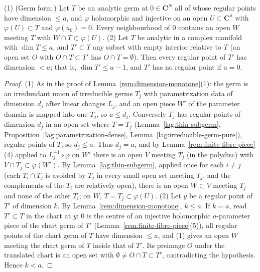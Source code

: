 \begin{lemma}
\label{rem:thin-dimension-drop}
\leanok
(1) (Germ form.) Let \(T\) be an analytic germ at \(0\in\mathbf C^N\) all of whose regular points have dimension \(\le a\), and \(\varphi\) holomorphic and injective on an
open \(U\subset\mathbf C^a\) with \(\varphi(U)\subset T\) and \(\varphi(u_0)=0\). Every neighbourhood of \(0\) contains an open \(W\) meeting \(T\) with \(W\cap T\subset\varphi(U)\).
(2) Let \(T\) be analytic in a complex manifold with \(\dim T\le a\), and \(T'\subset T\) any subset with empty interior relative to \(T\) (an open set \(O\) with
\(O\cap T\subset T'\) has \(O\cap T=\emptyset\)). Then every regular point of \(T'\) has dimension \(<a\); that is, \(\dim T'\le a-1\), and \(T'\) has no regular point if \(a=0\).
\end{lemma}
\begin{proof}
\leanok
(1) As in the proof of Lemma~\ref{rem:dimension-monotone}(1): the germ is an irredundant union of irreducible germs \(T_j\) with parametrization data of dimension \(d_j\) after
linear changes \(L_j\), and an open piece \(W'\) of the parameter domain is mapped into one \(T_j\), so \(a\le d_j\). Conversely \(T_j\) has regular points of dimension \(d_j\) in an
open set where \(T=T_j\) (Lemma~\ref{lag:thin-subgerm}, Proposition~\ref{lag:parametrization-dense}, Lemma~\ref{lag:irreducible-germ-pure}), regular points of \(T\), so \(d_j\le a\).
Thus \(d_j=a\), and by Lemma~\ref{rem:finite-fibre-piece}(4) applied to \(L_j^{-1}\circ\varphi\) on \(W'\) there is an open \(V\) meeting \(T_j\) (in the polydisc) with
\(V\cap T_j\subset\varphi(W')\). By Lemma~\ref{lag:thin-subgerm}, applied once for each \(i\ne j\) (each \(T_i\cap T_j\) is avoided by \(T_j\) in every small open set meeting
\(T_j\), and the complements of the \(T_i\) are relatively open), there is an open \(W\subset V\) meeting \(T_j\) and none of the other \(T_i\); on \(W\), \(T=T_j\subset\varphi(U)\).
(2) Let \(y\) be a regular point of \(T'\) of dimension \(k\). By Lemma~\ref{rem:dimension-monotone}, \(k\le a\). If \(k=a\), read \(T'\subset T\) in the chart at \(y\): \(0\) is the
centre of an injective holomorphic \(a\)-parameter piece of the chart germ of \(T'\) (Lemma~\ref{rem:finite-fibre-piece}(5)), all regular points of the chart germ of \(T\)
have dimension \(\le a\), and (1) gives an open \(W\) meeting the chart germ of \(T\) inside that of \(T'\). Its preimage \(O\) under the translated chart is an open set with
\(\emptyset\ne O\cap T\subset T'\), contradicting the hypothesis. Hence \(k<a\).
\end{proof}

